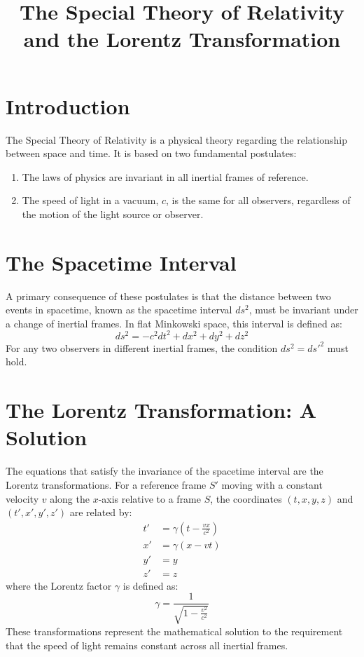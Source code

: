 \documentclass[12pt, a4paper]{article}
\title{The Special Theory of Relativity and the Lorentz Transformation}
\author{}
\date{}
\begin{document}
\maketitle

\section{Introduction}
The Special Theory of Relativity is a physical theory regarding the relationship between space and time. It is based on two fundamental postulates:
\begin{enumerate}
    \item The laws of physics are invariant in all inertial frames of reference.
    \item The speed of light in a vacuum, $c$, is the same for all observers, regardless of the motion of the light source or observer.
\end{enumerate}

\section{The Spacetime Interval}
A primary consequence of these postulates is that the distance between two events in spacetime, known as the spacetime interval $ds^2$, must be invariant under a change of inertial frames. In flat Minkowski space, this interval is defined as:
\begin{equation}
    ds^2 = -c^2 dt^2 + dx^2 + dy^2 + dz^2
\end{equation}
For any two observers in different inertial frames, the condition $ds^2 = ds'^2$ must hold.

\section{The Lorentz Transformation: A Solution}
The equations that satisfy the invariance of the spacetime interval are the Lorentz transformations. For a reference frame $S'$ moving with a constant velocity $v$ along the $x$-axis relative to a frame $S$, the coordinates $(t, x, y, z)$ and $(t', x', y', z')$ are related by:
\begin{align}
    t' &= \gamma \left( t - \frac{vx}{c^2} \right) \\
    x' &= \gamma (x - vt) \\
    y' &= y \\
    z' &= z
\end{align}
where the Lorentz factor $\gamma$ is defined as:
\begin{equation}
    \gamma = \frac{1}{\sqrt{1 - \frac{v^2}{c^2}}}
\end{equation}
These transformations represent the mathematical solution to the requirement that the speed of light remains constant across all inertial frames.
\end{document}
